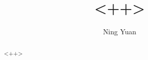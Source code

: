 \documentclass[a4paper]{article}
\begin{document}
\title{<++>}
\author{Ning Yuan}
\maketitle

\renewcommand{\abstractname}{<++>}
\begin{abstract}
<++>
\end{abstract}

\printbibliography
\end{document}
